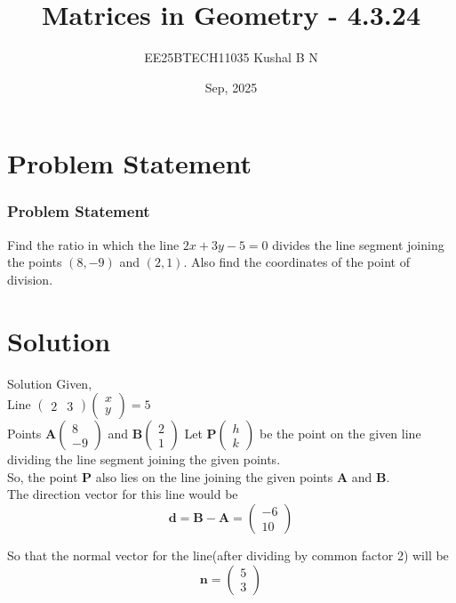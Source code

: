 \documentclass{beamer}
\title{Matrices in Geometry - 4.3.24}
\author{EE25BTECH11035  Kushal B N}
\date{Sep, 2025}
\let\vec\mathbf
\providecommand{\brak}[1]{\ensuremath{\left(#1\right)}}
\theoremstyle{remark}
\newcommand{\myvec}[1]{\ensuremath{\begin{pmatrix}#1\end{pmatrix}}}
\begin{document}
\maketitle

\section{Problem Statement}
\begin{frame}
\frametitle{Problem Statement}
Find the ratio in which the line $2x + 3y - 5 = 0$ divides the line segment joining the points $\brak{8,-9}$ and $\brak{2,1}$. Also find the coordinates of the point of division.
\end{frame}

\section{Solution}
\begin{frame}{Solution}
Given,\\
Line $\myvec{2 & 3}\myvec{x\\y} = 5$\\
Points $\vec{A}\myvec{8\\-9}$ and $\vec{B}\myvec{2\\1}$
Let $\vec{P}\myvec{h\\k}$ be the point on the given line dividing the line segment joining the given points. \\
So, the point $\vec{P}$ also lies on the line joining the given points $\vec{A}$ and $\vec{B}$.\\
The direction vector for this line would be\\
\begin{equation}
    \vec{d} = \vec{B} - \vec{A} = \myvec{-6\\10}
\end{equation}

So that the normal vector for the line(after dividing by common factor 2) will be\\
\begin{equation}
    \vec{n} = \myvec{5\\3}
\end{equation}
\end{frame}
\end{document}
